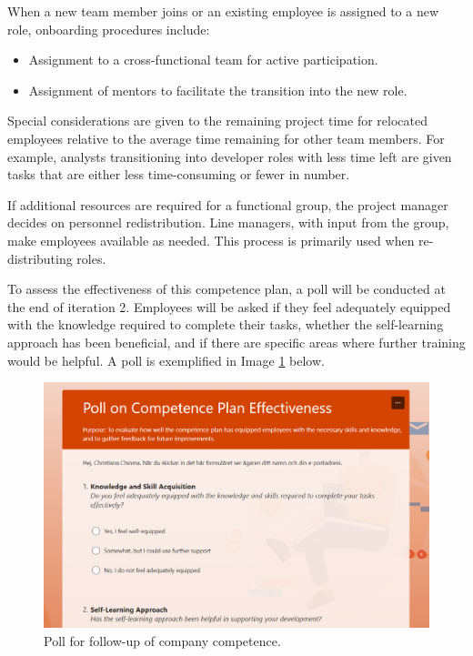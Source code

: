 When a new team member joins or an existing employee is assigned to a new role, onboarding procedures include:
\begin{itemize}
    \item Assignment to a cross-functional team for active participation.
    \item Assignment of mentors to facilitate the transition into the new role.
\end{itemize}

Special considerations are given to the remaining project time for relocated employees relative to the average time remaining for other team members. For example, analysts transitioning into developer roles with less time left are given tasks that are either less time-consuming or fewer in number.

If additional resources are required for a functional group, the project manager decides on personnel redistribution. Line managers, with input from the group, make employees available as needed. This process is primarily used when re-distributing roles. 

To assess the effectiveness of this competence plan, a poll will be conducted at the end of iteration 2. Employees will be asked if they feel adequately equipped with the knowledge required to complete their tasks, whether the self-learning approach has been beneficial, and if there are specific areas where further training would be helpful. A poll is exemplified in Image \ref{fig:competence_follow_up}
 below.

 \begin{figure}[h]
     \centering
     \includegraphics[width=0.75\linewidth]{competence_follow_up.png}
     \caption{Poll for follow-up of company competence.}
     \label{fig:competence_follow_up}
 \end{figure}

